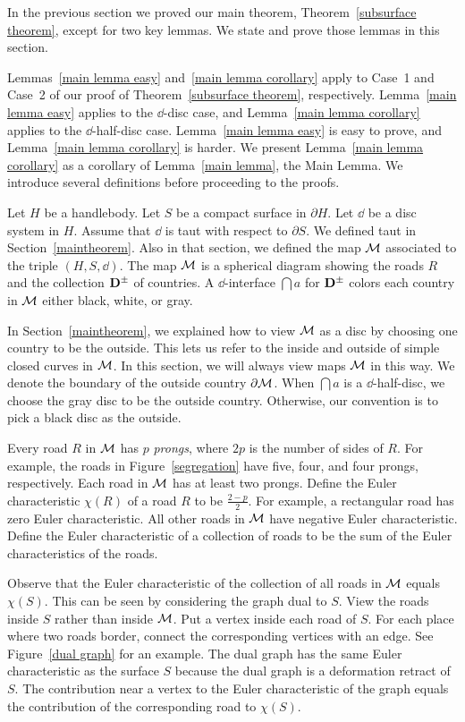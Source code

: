 In the previous section we proved our main theorem, Theorem~\ref{subsurface theorem}, except for two key lemmas.  We state and prove those lemmas in this section.

Lemmas~\ref{main lemma easy} and~\ref{main lemma corollary} apply to Case~1 and Case~2 of our proof of Theorem~\ref{subsurface theorem}, respectively.  Lemma~\ref{main lemma easy} applies to the $\dd$-disc case, and Lemma~\ref{main lemma corollary} applies to the $\dd$-half-disc case.  Lemma~\ref{main lemma easy} is easy to prove, and Lemma~\ref{main lemma corollary} is harder.  We present Lemma~\ref{main lemma corollary} as a corollary of Lemma~\ref{main lemma}, the Main Lemma.  We introduce several definitions before proceeding to the proofs.

Let $H$ be a handlebody.  Let $S$ be a compact surface in $\partial H$.  Let $\dd$ be a disc system in $H$.  Assume that $\dd$ is taut with respect to $\partial S$.  We defined taut in Section~\ref{maintheorem}.  Also in that section, we defined the map $\mathcal{M}$ associated to the triple $(H, S, \dd)$.  The map $\mathcal{M}$ is a spherical diagram showing the roads $R$ and the collection $\mathbf{D}^\pm$ of countries.  A $\dd$-interface $\dint{a}$ for $\mathbf{D}^\pm$ colors each country in $\mathcal{M}$ either black, white, or gray.

In Section~\ref{maintheorem}, we explained how to view $\mathcal{M}$ as a disc by choosing one country to be the outside.  This lets us refer to the inside and outside of simple closed curves in $\mathcal{M}$.  In this section, we will always view maps $\mathcal{M}$ in this way.  We denote the boundary of the outside country $\partial\mathcal{M}$.  When $\dint{a}$ is a $\dd$-half-disc, we choose the gray disc to be the outside country.  Otherwise, our convention is to pick a black disc as the outside.

Every road $R$ in $\mathcal{M}$ has $p$ \emph{prongs}, where $2p$ is the number of sides of $R$.  For example, the roads in Figure~\ref{segregation} have five, four, and four prongs, respectively.  Each road in $\mathcal{M}$ has at least two prongs.  Define the Euler characteristic $\chi(R)$ of a road $R$ to be $\frac{2-p}{2}$.  For example, a rectangular road has zero Euler characteristic.  All other roads in $\mathcal{M}$ have negative Euler characteristic.  Define the Euler characteristic of a collection of roads to be the sum of the Euler characteristics of the roads.

Observe that the Euler characteristic of the collection of all roads in $\mathcal{M}$ equals $\chi(S)$.  This can be seen by considering the graph dual to $S$.  View the roads inside $S$ rather than inside $\mathcal{M}$.  Put a vertex inside each road of $S$.  For each place where two roads border, connect the corresponding vertices with an edge.  See Figure~\ref{dual graph} for an example.  The dual graph has the same Euler characteristic as the surface $S$ because the dual graph is a deformation retract of $S$.  The contribution near a vertex to the Euler characteristic of the graph equals the contribution of the corresponding road to $\chi(S)$.


